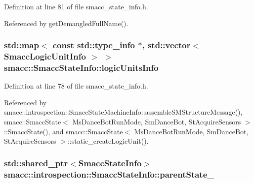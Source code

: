 Definition at line 81 of file smacc\+\_\+state\+\_\+info.\+h.



Referenced by get\+Demangled\+Full\+Name().

\subsubsection[{\texorpdfstring{logic\+Units\+Info}{logicUnitsInfo}}]{\setlength{\rightskip}{0pt plus 5cm}std\+::map$<$ const std\+::type\+\_\+info $\ast$, std\+::vector$<$ {\bf Smacc\+Logic\+Unit\+Info} $>$ $>$ smacc\+::\+Smacc\+State\+Info\+::logic\+Units\+Info\hspace{0.3cm}{\ttfamily [static]}}\hypertarget{classsmacc_1_1introspection_1_1SmaccStateInfo_a7a22f3c1ea22042a19f897db4ecfeb67}{}\label{classsmacc_1_1introspection_1_1SmaccStateInfo_a7a22f3c1ea22042a19f897db4ecfeb67}


Definition at line 78 of file smacc\+\_\+state\+\_\+info.\+h.



Referenced by smacc\+::introspection\+::\+Smacc\+State\+Machine\+Info\+::assemble\+S\+M\+Structure\+Message(), smacc\+::\+Smacc\+State$<$ Ms\+Dance\+Bot\+Run\+Mode, Sm\+Dance\+Bot, St\+Acquire\+Sensors $>$\+::\+Smacc\+State(), and smacc\+::\+Smacc\+State$<$ Ms\+Dance\+Bot\+Run\+Mode, Sm\+Dance\+Bot, St\+Acquire\+Sensors $>$\+::static\+\_\+create\+Logic\+Unit().

\subsubsection[{\texorpdfstring{parent\+State\+\_\+}{parentState_}}]{\setlength{\rightskip}{0pt plus 5cm}std\+::shared\+\_\+ptr$<${\bf Smacc\+State\+Info}$>$ smacc\+::introspection\+::\+Smacc\+State\+Info\+::parent\+State\+\_\+}\hypertarget{classsmacc_1_1introspection_1_1SmaccStateInfo_afa49a141d2ccdb3d6f9676ed380ce006}{}\label{classsmacc_1_1introspection_1_1SmaccStateInfo_afa49a141d2ccdb3d6f9676ed380ce006}


